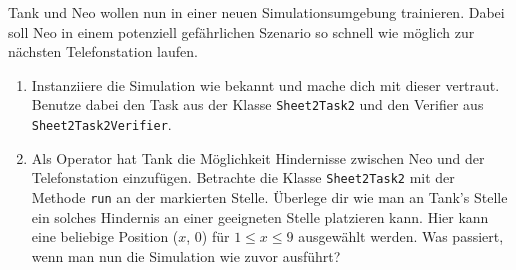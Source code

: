 Tank und Neo wollen nun in einer neuen Simulationsumgebung trainieren. 
Dabei soll Neo in einem potenziell gefährlichen Szenario so schnell wie möglich zur nächsten Telefonstation laufen.
\begin{enumerate}[label=\alph*)]
    \item Instanziiere die Simulation wie bekannt und mache dich mit dieser vertraut. Benutze dabei den Task aus der Klasse \lstinline{Sheet2Task2}
    und den Verifier aus \lstinline{Sheet2Task2Verifier}.
    \item Als Operator hat Tank die Möglichkeit Hindernisse zwischen Neo und der Telefonstation einzufügen.
    Betrachte die Klasse \lstinline{Sheet2Task2} mit der Methode \lstinline{run} an der markierten Stelle. Überlege dir wie man an Tank's Stelle 
    ein solches Hindernis an einer geeigneten Stelle platzieren kann. Hier kann eine beliebige Position ($x$, 0) für $1 \leq x \leq 9$ ausgewählt werden.
    Was passiert, wenn man nun die Simulation wie zuvor ausführt?
\end{enumerate}
